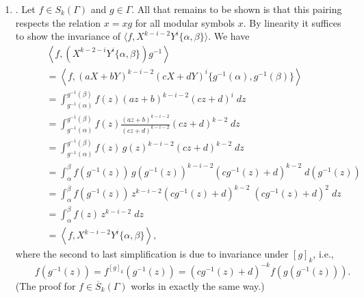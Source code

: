 \begin{enumerate}
\item {}.
  Let $f \in S_k(\Gamma)$ and $g \in \Gamma$. All that remains to be
  shown is that this pairing respects the relation $x=xg$ for all
  modular symbols $x$.  By linearity it suffices to show the invariance of
  $\langle f, X^{k-i-2}Y^i\{\alpha, \beta\} \rangle$.  We have
\begin{align*}
\qquad&\left\langle f, (X^{k-2-i}Y^i \{\alpha, \beta\})g^{-1} \right\rangle\\
& =  \left \langle f, (aX+bY)^{k-i-2}(cX+dY)^i \{g^{-1}(\alpha), g^{-1}(\beta)\} \right \rangle \\
& =  \int_{g^{-1}(\alpha)}^{g^{-1}(\beta)} f(z) (az+b)^{k-i-2}(cz+d)^i \; dz \\
& =  \int_{g^{-1}(\alpha)}^{g^{-1}(\beta)} f(z) \frac{(az+b)^{k-i-2}}{(cz+d)^{k-i-2}}(cz+d)^{k-2} \; dz \\
& =  \int_{g^{-1}(\alpha)}^{g^{-1}(\beta)} f(z) \, g(z)^{k-i-2} (cz+d)^{k-2} \; dz \\
& =  \int_{\alpha}^{\beta} f(g^{-1}(z)) \, g(g^{-1}(z))^{k-i-2} (cg^{-1}(z)+d)^{k-2} \; d(g^{-1}(z)) \\
& =  \int_{\alpha}^{\beta} f(g^{-1}(z)) \, z^{k-i-2} (cg^{-1}(z)+d)^{k-2} \; (cg^{-1}(z)+d)^2 \; dz \\
& =  \int_{\alpha}^{\beta} f(z) \, z^{k-i-2} \; dz \\
& =  \left \langle f, X^{k-i-2}Y^i \{ \alpha , \beta \} \right \rangle,
\end{align*}
where the second to last simplification is due to invariance under
$[g]_k$, i.e.,
$$\qquad f(g^{-1}(z)) = f^{[g]_k}(g^{-1}(z)) = (cg^{-1}(z)+d)^{-k} f(g(g^{-1}(z))).$$
(The proof for $f \in \overline{S}_k(\Gamma)$ works in
 exactly the same way.) 


\end{enumerate}
